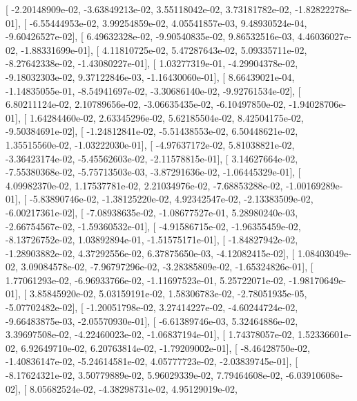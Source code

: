 \documentclass{article}
\begin{document}
       [ -2.20148909e-02,  -3.63849213e-02,   3.55118042e-02,
          3.73181782e-02,  -1.82822278e-01],
       [ -6.55444953e-02,   3.99254859e-02,   4.05541857e-03,
          9.48930524e-04,  -9.60426527e-02],
       [  6.49632328e-02,  -9.90540835e-02,   9.86532516e-03,
          4.46036027e-02,  -1.88331699e-01],
       [  4.11810725e-02,   5.47287643e-02,   5.09335711e-02,
         -8.27642338e-02,  -1.43080227e-01],
       [  1.03277319e-01,  -4.29904378e-02,  -9.18032303e-02,
          9.37122846e-03,  -1.16430060e-01],
       [  8.66439021e-04,  -1.14835055e-01,  -8.54941697e-02,
         -3.30686140e-02,  -9.92761534e-02],
       [  6.80211124e-02,   2.10789656e-02,  -3.06635435e-02,
         -6.10497850e-02,  -1.94028706e-01],
       [  1.64284460e-02,   2.63345296e-02,   5.62185504e-02,
          8.42504175e-02,  -9.50384691e-02],
       [ -1.24812841e-02,  -5.51438553e-02,   6.50448621e-02,
          1.35515560e-02,  -1.03222030e-01],
       [ -4.97637172e-02,   5.81038821e-02,  -3.36423174e-02,
         -5.45562603e-02,  -2.11578815e-01],
       [  3.14627664e-02,  -7.55380368e-02,  -5.75713503e-03,
         -3.87291636e-02,  -1.06445329e-01],
       [  4.09982370e-02,   1.17537781e-02,   2.21034976e-02,
         -7.68853288e-02,  -1.00169289e-01],
       [ -5.83890746e-02,  -1.38125220e-02,   4.92342547e-02,
         -2.13383509e-02,  -6.00217361e-02],
       [ -7.08938635e-02,  -1.08677527e-01,   5.28980240e-03,
         -2.66754567e-02,  -1.59360532e-01],
       [ -4.91586715e-02,  -1.96355459e-02,  -8.13726752e-02,
          1.03892894e-01,  -1.51575171e-01],
       [ -1.84827942e-02,  -1.28903882e-02,   4.37292556e-02,
          6.37875650e-03,  -4.12082415e-02],
       [  1.08403049e-02,   3.09084578e-02,  -7.96797296e-02,
         -3.28385809e-02,  -1.65324826e-01],
       [  1.77061293e-02,  -6.96933766e-02,  -1.11697523e-01,
          5.25722071e-02,  -1.98170649e-01],
       [  3.85845920e-02,   5.03159191e-02,   1.58306783e-02,
         -2.78051935e-05,  -5.07702482e-02],
       [ -1.20051798e-02,   3.27414227e-02,  -4.60244724e-02,
         -9.66483875e-03,  -2.05570930e-01],
       [ -6.61389746e-03,   5.32464886e-02,   3.39697508e-02,
         -4.22460023e-02,  -1.06837194e-01],
       [  1.74378057e-02,   1.52336601e-02,   6.92649710e-02,
          6.20763814e-02,  -1.79209002e-01],
       [ -8.46428750e-02,  -1.40836147e-02,  -5.24614581e-02,
          4.05777723e-02,  -2.03839745e-01],
       [ -8.17624321e-02,   3.50779889e-02,   5.96029339e-02,
          7.79464608e-02,  -6.03910608e-02],
       [  8.05682524e-02,  -4.38298731e-02,   4.95129019e-02,
\end{document}
